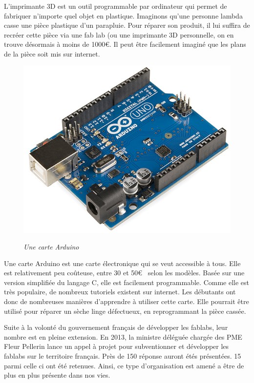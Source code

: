 L'imprimante 3D est un outil programmable par ordinateur qui permet de fabriquer n'importe quel objet en plastique. Imaginons qu'une personne lambda casse une pièce plastique d'un parapluie. Pour réparer son produit, il lui suffira de recréer cette pièce via une fab lab (ou une imprimante 3D personnelle, on en trouve désormais à moins de 1000\euro. Il peut être facilement imaginé que les plans de la pièce soit mis sur internet. 

\begin{figure}
\begin{center}
\vspace{-1cm}\includegraphics[scale=0.25]{Rsc/Arduino.png} 

\textit{Une carte Arduino}
\end{center}
\end{figure}

Une carte Arduino est une carte électronique qui se veut accessible à tous. Elle est relativement peu coûteuse, entre 30 et 50\euro~ selon les modèles. Basée sur une version simplifiée du langage C, elle est facilement programmable. Comme elle est très populaire, de nombreux tutoriels existent sur internet. Les débutants ont donc de nombreuses manières d'apprendre à utiliser cette carte. Elle pourrait être utilisé pour réparer un sèche linge défectueux, en reprogrammant la pièce cassée.

\medbreak

Suite à la volonté du gouvernement français de développer les fablabs, leur nombre est en pleine extension. En 2013, la ministre déléguée chargée des PME Fleur Pellerin lance un appel à projet pour subventionner et développer les fablabs sur le territoire français. Près de 150 réponse auront étés présentées. 15 parmi celle ci ont été retenues. Ainsi,  ce type d'organisation est amené a être de plus en plus présente dans nos vies. 

